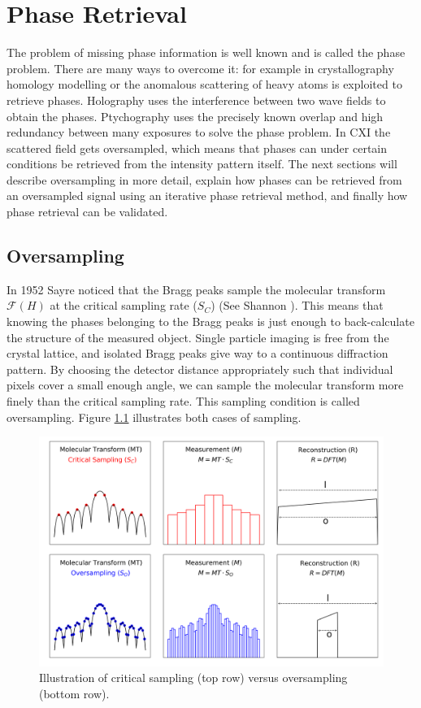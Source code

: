\chapter{Phase Retrieval}
The problem of missing phase information is well known and is called the phase problem. There are many ways to overcome it: for example in crystallography homology modelling or the anomalous scattering of heavy atoms is exploited to retrieve phases. Holography uses the interference between two wave fields to obtain the phases. Ptychography uses the precisely known overlap and high redundancy between many exposures to solve the phase problem. In CXI the scattered field gets oversampled, which means that phases can under certain conditions be retrieved from the intensity pattern itself. The next sections will describe oversampling in more detail, explain how phases can be retrieved from an oversampled signal using an iterative phase retrieval method, and finally how phase retrieval can be validated. 

\section{Oversampling} 
In 1952 Sayre noticed that the Bragg peaks sample the molecular transform $\mathcal{F}(H)$ at the critical sampling rate ($S_C$)\cite{Sayre1952a} (See Shannon \cite{Shannon1949a}). This means that knowing the phases belonging to the Bragg peaks is just enough to back-calculate the structure of the measured object. Single particle imaging is free from the crystal lattice, and isolated Bragg peaks give way to a continuous diffraction pattern. By choosing the detector distance appropriately such that individual pixels cover a small enough angle, we can sample the molecular transform more finely than the critical sampling rate. This sampling condition is called oversampling. Figure \ref{fig:sampling} illustrates both cases of sampling. 

\begin{figure}[h]
	\centering 
		\includegraphics[width=120mm]{Chapter_06_Sampling.png}
	\caption{Illustration of critical sampling (top row) versus oversampling (bottom row).}
	\label{fig:sampling}
\end{figure}

